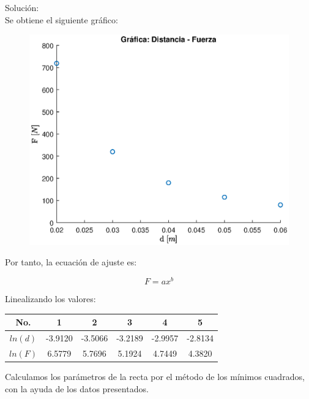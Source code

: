 \documentclass[letter,11pt]{article}
\begin{document}
\begin{enumerate}
    Solución: \\
    Se obtiene el siguiente gráfico:

    \begin{figure}[!h]
    \centering
    \includegraphics[scale=0.75]{resources/m2.eps}
    \end{figure}

    Por tanto, la ecuación de ajuste es:

    \begin{equation*}
        F = a x^b
    \end{equation*}

    Linealizando los valores:

    \begin{center}
    \begin{tabular}{|c|c|c|c|c|c|}
    \hline
    No. & 1 & 2 & 3 & 4 & 5 \tabularnewline \hline
    $ln(d)$ & -3.9120 & -3.5066 & -3.2189 & -2.9957 & -2.8134 \tabularnewline \hline
    $ln(F)$ & 6.5779 & 5.7696 & 5.1924 & 4.7449 & 4.3820 \tabularnewline \hline
    \end{tabular}
    \end{center}

    Calculamos los parámetros de la recta por el método de los mínimos cuadrados,
    con la ayuda de los datos presentados.


\end{enumerate}
\end{document}
